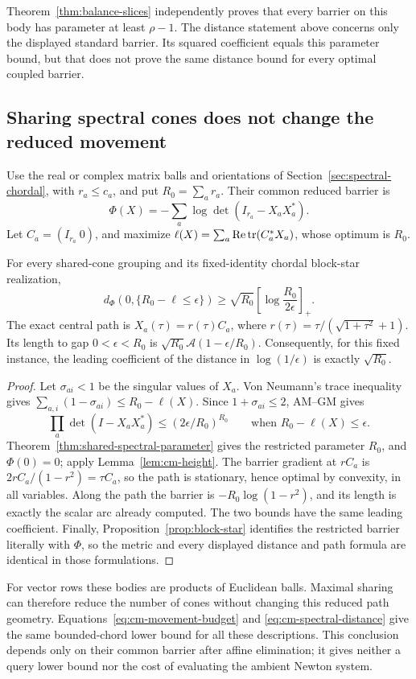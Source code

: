 Theorem~\ref{thm:balance-slices} independently proves that every
barrier on this body has parameter at least $\rho-1$.  The distance
statement above concerns only the displayed standard barrier.  Its
squared coefficient equals this parameter bound, but that does not
prove the same distance bound for every optimal coupled barrier.

\subsection{Sharing spectral cones does not change the reduced movement}

Use the real or complex matrix balls and orientations of
Section~\ref{sec:spectral-chordal}, with $r_a\leq c_a$, and put
$R_0=\sum_ar_a$.  Their common reduced barrier is
\[
 \Phi(X)=-\sum_a\log\det(I_{r_a}-X_aX_a^*).
\]
Let $C_a=(I_{r_a}\ 0)$, and maximize
$\ell(X)=\sum_a\operatorname{Re}\operatorname{tr}(C_a^*X_a)$, whose optimum
is $R_0$.

\begin{proposition}
\label{prop:cm-spectral}
For every shared-cone grouping and its fixed-identity chordal block-star
realization,
\begin{equation}\label{eq:cm-spectral-distance}
 d_\Phi(0,\{R_0-\ell\leq\epsilon\})
 \geq\sqrt{R_0}\left[\log\frac{R_0}{2\epsilon}\right]_+.
\end{equation}
The exact central path is $X_a(\tau)=r(\tau)C_a$, where
$r(\tau)=\tau/(\sqrt{1+\tau^2}+1)$.  Its length to gap
$0<\epsilon<R_0$ is
$\sqrt{R_0}\mathcal A(1-\epsilon/R_0)$.
Consequently, for this fixed instance, the leading coefficient of the
distance in $\log(1/\epsilon)$ is exactly $\sqrt{R_0}$.
\end{proposition}
\begin{proof}
Let $\sigma_{ai}<1$ be the singular values of $X_a$.
Von Neumann's trace inequality gives
$\sum_{a,i}(1-\sigma_{ai})\leq R_0-\ell(X)$.
Since $1+\sigma_{ai}\leq2$, AM--GM gives
\[
 \prod_a\det(I-X_aX_a^*)
 \leq(2\epsilon/R_0)^{R_0}
 \qquad\text{when }R_0-\ell(X)\leq\epsilon.
\]
Theorem~\ref{thm:shared-spectral-parameter} gives the restricted
parameter $R_0$, and $\Phi(0)=0$; apply
Lemma~\ref{lem:cm-height}.  The barrier gradient at $rC_a$ is
$2rC_a/(1-r^2)=\tau C_a$, so the path is stationary, hence optimal by
convexity, in all variables.
Along the path the barrier is $-R_0\log(1-r^2)$, and its length
is exactly the scalar arc already computed.
The two bounds have the same leading coefficient.
Finally, Proposition~\ref{prop:block-star} identifies the restricted
barrier literally with $\Phi$, so the metric and every displayed
distance and path formula are identical in those formulations.
\end{proof}

For vector rows these bodies are products of Euclidean balls.
Maximal sharing can therefore reduce the number of cones without
changing this reduced path geometry.
Equations~\eqref{eq:cm-movement-budget} and
\eqref{eq:cm-spectral-distance} give the same bounded-chord lower
bound for all these descriptions.  This conclusion depends only on
their common barrier after affine elimination; it gives neither a query
lower bound nor the cost of evaluating the ambient Newton system.
